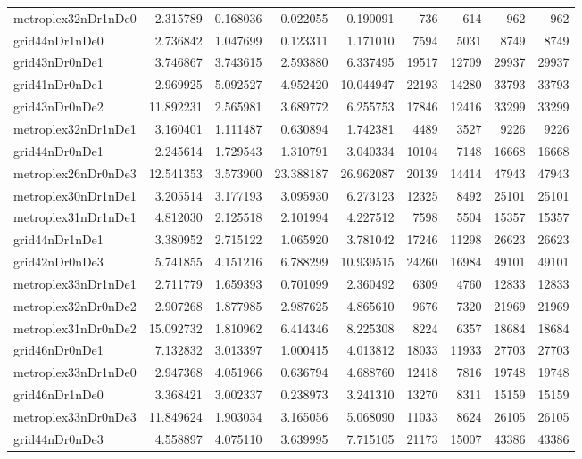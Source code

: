 \begin{longtable}{|l|r|r|r|r|r|r|r|r|}
metroplex32nDr1nDe0 & 2.315789 & 0.168036 & 0.022055 & 0.190091 & 736 & 614 & 962 & 962 \\
grid44nDr1nDe0 & 2.736842 & 1.047699 & 0.123311 & 1.171010 & 7594 & 5031 & 8749 & 8749 \\
grid43nDr0nDe1 & 3.746867 & 3.743615 & 2.593880 & 6.337495 & 19517 & 12709 & 29937 & 29937 \\
grid41nDr0nDe1 & 2.969925 & 5.092527 & 4.952420 & 10.044947 & 22193 & 14280 & 33793 & 33793 \\
grid43nDr0nDe2 & 11.892231 & 2.565981 & 3.689772 & 6.255753 & 17846 & 12416 & 33299 & 33299 \\
metroplex32nDr1nDe1 & 3.160401 & 1.111487 & 0.630894 & 1.742381 & 4489 & 3527 & 9226 & 9226 \\
grid44nDr0nDe1 & 2.245614 & 1.729543 & 1.310791 & 3.040334 & 10104 & 7148 & 16668 & 16668 \\
metroplex26nDr0nDe3 & 12.541353 & 3.573900 & 23.388187 & 26.962087 & 20139 & 14414 & 47943 & 47943 \\
metroplex30nDr1nDe1 & 3.205514 & 3.177193 & 3.095930 & 6.273123 & 12325 & 8492 & 25101 & 25101 \\
metroplex31nDr1nDe1 & 4.812030 & 2.125518 & 2.101994 & 4.227512 & 7598 & 5504 & 15357 & 15357 \\
grid44nDr1nDe1 & 3.380952 & 2.715122 & 1.065920 & 3.781042 & 17246 & 11298 & 26623 & 26623 \\
grid42nDr0nDe3 & 5.741855 & 4.151216 & 6.788299 & 10.939515 & 24260 & 16984 & 49101 & 49101 \\
metroplex33nDr1nDe1 & 2.711779 & 1.659393 & 0.701099 & 2.360492 & 6309 & 4760 & 12833 & 12833 \\
metroplex32nDr0nDe2 & 2.907268 & 1.877985 & 2.987625 & 4.865610 & 9676 & 7320 & 21969 & 21969 \\
metroplex31nDr0nDe2 & 15.092732 & 1.810962 & 6.414346 & 8.225308 & 8224 & 6357 & 18684 & 18684 \\
grid46nDr0nDe1 & 7.132832 & 3.013397 & 1.000415 & 4.013812 & 18033 & 11933 & 27703 & 27703 \\
metroplex33nDr1nDe0 & 2.947368 & 4.051966 & 0.636794 & 4.688760 & 12418 & 7816 & 19748 & 19748 \\
grid46nDr1nDe0 & 3.368421 & 3.002337 & 0.238973 & 3.241310 & 13270 & 8311 & 15159 & 15159 \\
metroplex33nDr0nDe3 & 11.849624 & 1.903034 & 3.165056 & 5.068090 & 11033 & 8624 & 26105 & 26105 \\
grid44nDr0nDe3 & 4.558897 & 4.075110 & 3.639995 & 7.715105 & 21173 & 15007 & 43386 & 43386 \\

\end{longtable}
